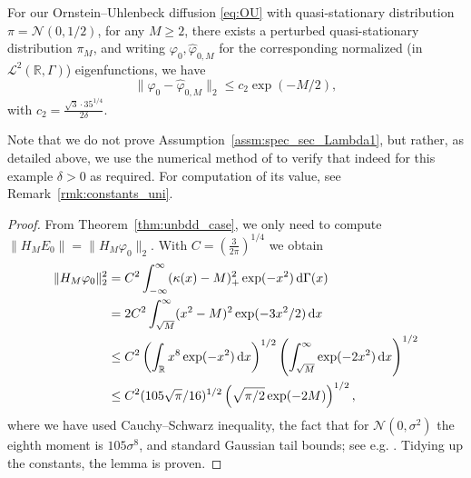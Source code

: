 \documentclass{aptpub}
\newcommand{\R}{\mathbb R}
\begin{document}
\begin{lemma}
    For our Ornstein--Uhlenbeck diffusion \eqref{eq:OU} with quasi-stationary distribution $\pi=\mathcal N(0,1/2)$, for any $M\ge 2$, there exists a perturbed quasi-stationary distribution $\pi_M$, and writing $\varphi_0, \widehat{\varphi}_{0,M}$ for the corresponding normalized (in $\mathcal L^2(\R,\Gamma)$) eigenfunctions, we have
    \begin{equation*}
        \|\varphi_0 -  \widehat{\varphi}_{0,M}\|_2 \le c_2 \exp(-M/2),
    \end{equation*}
    with $c_2=\frac{\sqrt{3}\cdot 35^{1/4}}{2\delta}$. 
    \label{prop:OU_exam_L2}
\end{lemma}
Note that we do not prove  Assumption~\ref{assm:spec_sec_Lambda1}, but rather, as detailed above, we use the numerical method of \cite{Mielnik1996} to verify that indeed for this example $\delta >0$ as required. For computation of its value, see Remark~\ref{rmk:constants_uni}.
\begin{proof}
    From Theorem~\ref{thm:unbdd_case}, we only need to compute $\|H_M E_0\|=\|H_M \varphi_0\|_2$. With $C=\left( \frac{3}{2\pi}\right)^{1/4}$ we obtain
    \begin{align*}
        \|H_M \varphi_0\|^2_2 &= C^2 \int_{-\infty}^\infty (\kappa(x)-M)_+^2 \exp(-x^2) \dif \Gamma(x)\\
        &= 2C^2 \int_{\sqrt M}^\infty (x^2-M)^2 \exp(-3x^2/2)\dif x\\
        &\le C^2 \left (\int_\R x^8 \exp(-x^2) \dif x\right)^{1/2} \left( \int_{\sqrt M}^\infty \exp(-2x^2)\dif x \right)^{1/2}\\
        &\le C^2 (105 \sqrt{\pi}/16)^{1/2} \left( \sqrt{\pi/2} \exp(-2M) \right)^{1/2},
    \end{align*}
    where we have used Cauchy--Schwarz inequality, the fact that for $\mathcal N(0,\sigma^2)$ the eighth moment is $105\sigma^8$, and standard Gaussian tail bounds; see e.g. \cite[Proposition 2.5]{Wainwright2019}. Tidying up the constants, the lemma is proven.
\end{proof}
\end{document}
